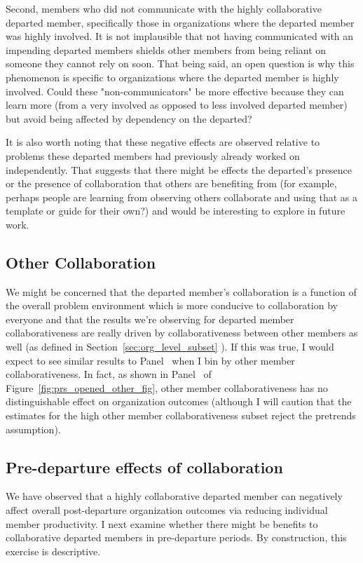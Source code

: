\documentclass[12pt,notitlepage]{article}
\begin{document}
Second, members who did not communicate with the highly collaborative departed member, specifically those in organizations where the departed member was highly involved. It is not implausible that not having communicated with an impending departed members shields other members from being reliant on someone they cannot rely on soon. That being said, an open question is why this phenomenon is specific to organizations where the departed member is highly involved. Could these "non-communicators" be more effective because they can learn more (from a very involved as opposed to less involved departed member) but avoid being affected by dependency on the departed?

It is also worth noting that these negative effects are observed relative to problems these departed members had previously already worked on independently. That suggests that there might be effects the departed's presence or the presence of collaboration that others are benefiting from (for example, perhaps people are learning from observing others collaborate and using that as a template or guide for their own?) and would be interesting to explore in future work.

\subsection{Other Collaboration}
We might be concerned that the departed member's collaboration is a function of the overall problem environment which is more conducive to collaboration by everyone and that the results we're observing for departed member collaborativeness are really driven by collaborativeness between other members as well (as defined in Section~\ref{sec:org_level_subset} ). If this was true, I would expect to see similar results to Panel~ when I bin by other member collaborativeness. In fact, as shown in Panel~ of Figure~\ref{fig:prs_opened_other_fig}, other member collaborativeness has no distinguishable effect on organization outcomes (although I will caution that the estimates for the high other member collaborativeness subset reject the pretrends assumption). 

\subsection{Pre-departure effects of collaboration}
We have observed that a highly collaborative departed member can negatively affect overall post-departure organization outcomes via reducing individual member productivity. I next examine whether there might be benefits to collaborative departed members in pre-departure periods. By construction, this exercise is descriptive. 
\end{document}
